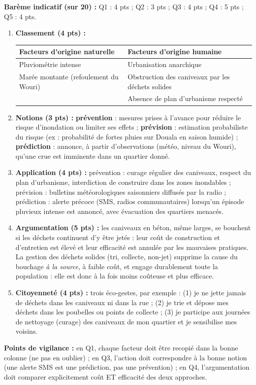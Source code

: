\documentclass[11pt]{article}
\begin{document}
\begin{corrige}
\textbf{Barème indicatif (sur 20) :} Q1 : 4 pts ; Q2 : 3 pts ; Q3 : 4 pts ; Q4 : 5 pts ; Q5 : 4 pts.

\begin{enumerate}
\item \textbf{Classement (4 pts) :}
\begin{center}
\begin{tabularx}{\linewidth}{|X|X|}\hline
\rowcolor{popblueL}\textbf{Facteurs d'origine naturelle} & \textbf{Facteurs d'origine humaine} \\ \hline
Pluviométrie intense & Urbanisation anarchique \\ \hline
Marée montante (refoulement du Wouri) & Obstruction des caniveaux par les déchets solides \\ \hline
 & Absence de plan d'urbanisme respecté \\ \hline
\end{tabularx}
\end{center}
\item \textbf{Notions (3 pts) :} \textbf{prévention} : mesures prises à l'avance pour réduire le risque d'inondation ou limiter ses effets ; \textbf{prévision} : estimation probabiliste du risque (ex : probabilité de fortes pluies sur Douala en saison humide) ; \textbf{prédiction} : annonce, à partir d'observations (météo, niveau du Wouri), qu'une crue est imminente dans un quartier donné.
\item \textbf{Application (4 pts) :} prévention : curage régulier des caniveaux, respect du plan d'urbanisme, interdiction de construire dans les zones inondables ; prévision : bulletins météorologiques saisonniers diffusés par la radio ; prédiction : alerte précoce (SMS, radios communautaires) lorsqu'un épisode pluvieux intense est annoncé, avec évacuation des quartiers menacés.
\item \textbf{Argumentation (5 pts) :} les caniveaux en béton, même larges, se bouchent si les déchets continuent d'y être jetés : leur coût de construction et d'entretien est élevé et leur efficacité est annulée par les mauvaises pratiques. La gestion des déchets solides (tri, collecte, non-jet) supprime la cause du bouchage \emph{à la source}, à faible coût, et engage durablement toute la population : elle est donc à la fois moins coûteuse et plus efficace.
\item \textbf{Citoyenneté (4 pts) :} trois éco-gestes, par exemple : (1) je ne jette jamais de déchets dans les caniveaux ni dans la rue ; (2) je trie et dépose mes déchets dans les poubelles ou points de collecte ; (3) je participe aux journées de nettoyage (curage) des caniveaux de mon quartier et je sensibilise mes voisins.
\end{enumerate}
\textbf{Points de vigilance :} en Q1, chaque facteur doit être recopié dans la bonne colonne (ne pas en oublier) ; en Q3, l'action doit correspondre à la bonne notion (une alerte SMS est une prédiction, pas une prévention) ; en Q4, l'argumentation doit comparer explicitement coût ET efficacité des deux approches.
\end{corrige}
\end{document}
